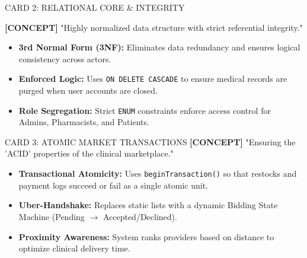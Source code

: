 \documentclass[12pt, a4paper]{article}
\begin{document}
\begin{presentercard}{CARD 2: RELATIONAL CORE \& INTEGRITY}
    \begin{minipage}{0.62\textwidth}
        \textbf{[CONCEPT]} "Highly normalized data structure with strict referential integrity."
        \begin{itemize}
            \item \textbf{3rd Normal Form (3NF):} Eliminates data redundancy and ensures logical consistency across actors.
            \item \textbf{Enforced Logic:} Uses \texttt{ON DELETE CASCADE} to ensure medical records are purged when user accounts are closed.
            \item \textbf{Role Segregation:} Strict \texttt{ENUM} constraints enforce access control for Admins, Pharmacists, and Patients.
        \end{itemize}
    \end{minipage}
    \begin{minipage}{0.35\textwidth}
        \centering
    \end{minipage}
\end{presentercard}

\vspace{0.4cm}

\begin{presentercard}{CARD 3: ATOMIC MARKET TRANSACTIONS}
    \textbf{[CONCEPT]} "Ensuring the 'ACID' properties of the clinical marketplace."
    \begin{itemize}
        \item \textbf{Transactional Atomicity:} Uses \texttt{beginTransaction()} so that restocks and payment logs succeed or fail as a single atomic unit.
        \item \textbf{Uber-Handshake:} Replaces static lists with a dynamic Bidding State Machine (Pending $\to$ Accepted/Declined).
        \item \textbf{Proximity Awareness:} System ranks providers based on distance to optimize clinical delivery time.
    \end{itemize}
\end{presentercard}
\end{document}
